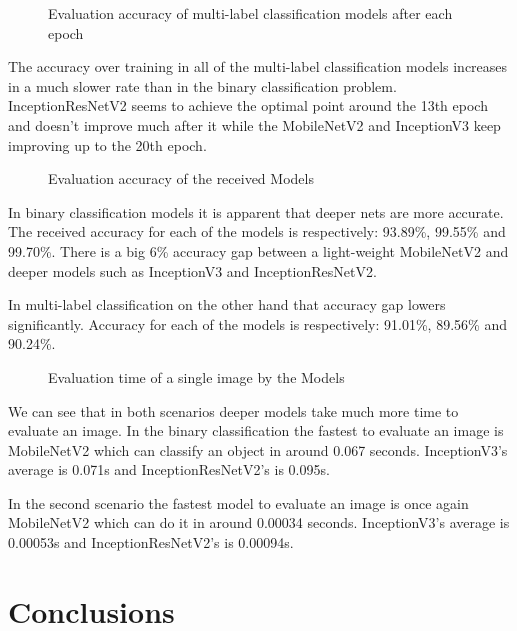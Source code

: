 \documentclass{ijisa}
\begin{document}
\begin{figure}[!h]
\centering
\scalebox{0.5}{}
\caption{Evaluation accuracy of multi-label classification models after each epoch} \label{fig:fig10}
\end{figure}

The accuracy over training in all of the multi-label classification models increases in a much slower rate than in the binary classification problem. InceptionResNetV2 seems to achieve the optimal point around the 13th epoch and doesn't improve much after it while the MobileNetV2 and InceptionV3 keep improving up to the 20th epoch.


\begin{figure}[!h]
\centering
\scalebox{0.5}{}
\caption{Evaluation accuracy of the received Models} \label{fig:fig10}
\end{figure}

In binary classification models it is apparent that deeper nets are more accurate. The received accuracy for each of the models is respectively: 93.89\%, 99.55\% and 99.70\%. There is a big 6\% accuracy gap between a light-weight MobileNetV2 and  deeper models such as InceptionV3 and InceptionResNetV2.

In multi-label classification on the other hand that accuracy gap lowers significantly. Accuracy for each of the models is respectively: 91.01\%, 89.56\% and 90.24\%.


\begin{figure}[!h]
\centering
\scalebox{0.5}{}
\caption{Evaluation time of a single image by the Models} \label{fig:fig11}
\end{figure}

We can see that in both scenarios deeper models take much more time to evaluate an image. In the binary classification the fastest to evaluate an image is MobileNetV2 which can classify an object in around 0.067 seconds. InceptionV3's average is 0.071s and InceptionResNetV2's is 0.095s.

In the second scenario the fastest model to evaluate an image is once again MobileNetV2 which can do it in around 0.00034 seconds. InceptionV3's average is 0.00053s and InceptionResNetV2's is 0.00094s.

\section{Conclusions}
\end{document}
